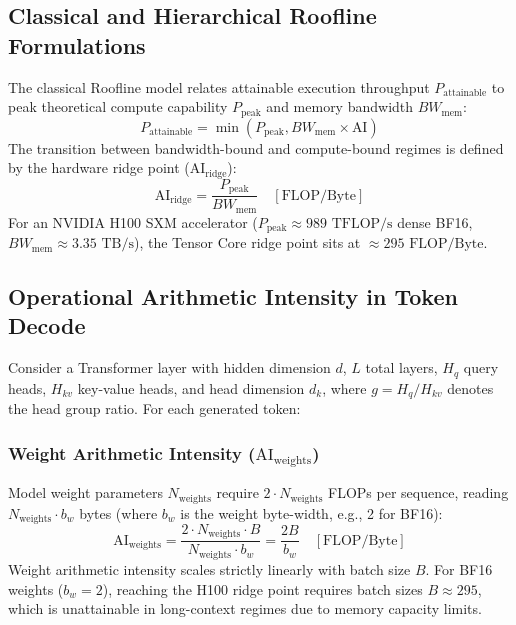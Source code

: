 \documentclass[conference,onecolumn]{IEEEtran}
\begin{document}
\subsection{Classical and Hierarchical Roofline Formulations}
The classical Roofline model \cite{williams2009roofline} relates attainable execution throughput $P_{\text{attainable}}$ to peak theoretical compute capability $P_{\text{peak}}$ and memory bandwidth $BW_{\text{mem}}$:
\begin{equation}
P_{\text{attainable}} = \min \left( P_{\text{peak}}, BW_{\text{mem}} \times \text{AI} \right)
\end{equation}
The transition between bandwidth-bound and compute-bound regimes is defined by the hardware ridge point ($\text{AI}_{\text{ridge}}$):
\begin{equation}
\text{AI}_{\text{ridge}} = \frac{P_{\text{peak}}}{BW_{\text{mem}}} \quad [\text{FLOP/Byte}]
\end{equation}
For an NVIDIA H100 SXM accelerator ($P_{\text{peak}} \approx 989\text{ TFLOP/s}$ dense BF16, $BW_{\text{mem}} \approx 3.35\text{ TB/s}$), the Tensor Core ridge point sits at $\approx 295\text{ FLOP/Byte}$.

\subsection{Operational Arithmetic Intensity in Token Decode}
Consider a Transformer layer with hidden dimension $d$, $L$ total layers, $H_q$ query heads, $H_{kv}$ key-value heads, and head dimension $d_k$, where $g = H_q / H_{kv}$ denotes the head group ratio. For each generated token:

\subsubsection{Weight Arithmetic Intensity ($\text{AI}_{\text{weights}}$)}
Model weight parameters $N_{\text{weights}}$ require $2 \cdot N_{\text{weights}}$ FLOPs per sequence, reading $N_{\text{weights}} \cdot b_w$ bytes (where $b_w$ is the weight byte-width, e.g., 2 for BF16):
\begin{equation}
\text{AI}_{\text{weights}} = \frac{2 \cdot N_{\text{weights}} \cdot B}{N_{\text{weights}} \cdot b_w} = \frac{2B}{b_w} \quad [\text{FLOP/Byte}]
\end{equation}
Weight arithmetic intensity scales strictly linearly with batch size $B$. For BF16 weights ($b_w = 2$), reaching the H100 ridge point requires batch sizes $B \approx 295$, which is unattainable in long-context regimes due to memory capacity limits.
\end{document}
